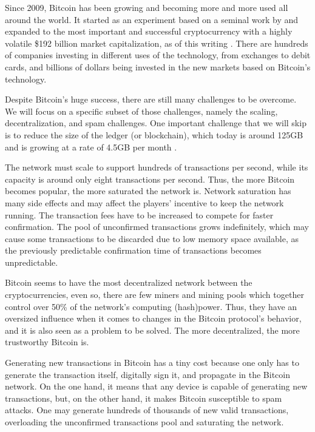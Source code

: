 Since 2009, Bitcoin has been growing and becoming more and more used all around the world. It started as an experiment based on a seminal work by \citet{nakamoto2008bitcoin} and expanded to the most important and successful cryptocurrency with a highly volatile \$192 billion market capitalization, as of this writing \citep{coinmarketcapbtc}. There are hundreds of companies investing in different uses of the technology, from exchanges to debit cards, and billions of dollars being invested in the new markets based on Bitcoin's technology.

Despite Bitcoin's huge success, there are still many challenges to be overcome. We will focus on a specific subset of those challenges, namely the scaling, decentralization, and spam challenges. One important challenge that we will skip is to reduce the size of the ledger (or blockchain), which today is around 125GB and is growing at a rate of 4.5GB per month \citep{blockchaininfosize}.

The network must scale to support hundreds of transactions per second, while its capacity is around only eight transactions per second. Thus, the more Bitcoin becomes popular, the more saturated the network is. Network saturation has many side effects and may affect the players' incentive to keep the network running. The transaction fees have to be increased to compete for faster confirmation. The pool of unconfirmed transactions grows indefinitely, which may cause some transactions to be discarded due to low memory space available, as the previously predictable confirmation time of transactions becomes unpredictable.

Bitcoin seems to have the most decentralized network between the cryptocurrencies, even so, there are few miners and mining pools which together control over 50\% of the network’s computing (hash)power. Thus, they have an oversized influence when it comes to changes in the Bitcoin protocol's behavior, and it is also seen as a problem to be solved. The more decentralized, the more trustworthy Bitcoin is.

Generating new transactions in Bitcoin has a tiny cost because one only has to generate the transaction itself, digitally sign it, and propagate in the Bitcoin network. On the one hand, it means that any device is capable of generating new transactions, but, on the other hand, it makes Bitcoin susceptible to spam attacks. One may generate hundreds of thousands of new valid transactions, overloading the unconfirmed transactions pool and saturating the network.

